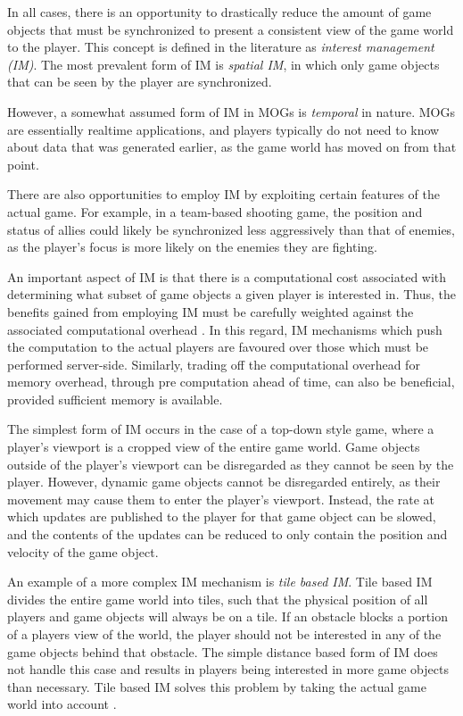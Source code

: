 In all cases, there is an opportunity to drastically reduce the amount of game objects that must be synchronized to present a consistent view of the game world to the player. This concept is defined in the literature as \textit{interest management (IM)}. The most prevalent form of IM is \textit{spatial IM}, in which only game objects that can be seen by the player are synchronized.

However, a somewhat assumed form of IM in MOGs is \textit{temporal} in nature. MOGs are essentially realtime applications, and players typically do not need to know about data that was generated earlier, as the game world has moved on from that point. 

There are also opportunities to employ IM by exploiting certain features of the actual game. For example, in a team-based shooting game, the position and status of allies could likely be synchronized less aggressively than that of enemies, as the player's focus is more likely on the enemies they are fighting.

An important aspect of IM is that there is a computational cost associated with determining what subset of game objects a given player is interested in. Thus, the benefits gained from employing IM must be carefully weighted against the associated computational overhead \cite{im-thesis}. 
In this regard, IM mechanisms which push the computation to the actual players are favoured over those which must be performed server-side. Similarly, trading off the computational overhead for memory overhead, through pre computation ahead of time, can also be beneficial, provided sufficient memory is available.

The simplest form of IM occurs in the case of a top-down style game, where a player's viewport is a cropped view of the entire game world. Game objects outside of the player's viewport can be disregarded as they cannot be seen by the player. However, dynamic game objects  cannot be disregarded entirely, as their movement may cause them to enter the player's viewport. Instead, the rate at which updates are published to the player for that game object can be slowed, and the contents of the updates can be reduced to only contain the position and velocity of the game object.

An example of a more complex IM mechanism is \textit{tile based IM}. Tile based IM divides the entire game world into tiles, such that the physical position of all players and game objects will always be on a tile. If an obstacle blocks a portion of a players view of the world, the player should not be interested in any of the game objects behind that obstacle. The simple distance based form of IM does not handle this case and results in players being interested in more game objects than necessary. Tile based IM solves this problem by taking the actual game world into account \cite{pub-sub-mog}.

